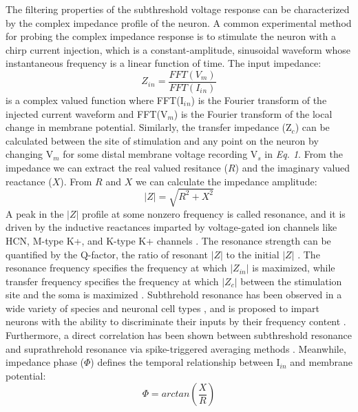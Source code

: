 \documentclass[utf8]{frontiersSCNS} %
\begin{document}
The filtering properties of the subthreshold voltage response can be characterized by the complex impedance profile of the neuron.
A common experimental method for probing the complex impedance response is to stimulate the neuron with a chirp current injection, which
is a constant-amplitude, sinusoidal waveform whose instantaneous frequency is a linear function of time.  The input impedance:
\begin{equation}  Z_i{_n} = \frac{FFT(V_m)}{FFT(I_i{_n})} \label{eq:01}\end{equation}
is a complex valued function where FFT(I$_i{_n}$) is the Fourier transform of the injected current waveform and FFT(V$_m$) is the Fourier
transform of the local change in membrane potential.  Similarly, the transfer impedance (Z$_c$) can be calculated between the site of stimulation
and any point on the neuron by changing V$_m$ for some distal membrane voltage recording V$_s$ in \emph{Eq. 1}. From the impedance we can
extract the real valued resitance ($R$) and the imaginary valued reactance ($X$).  From $R$ and $X$ we can calculate the impedance amplitude:
\begin{equation} |Z| = \sqrt{R^2 + X^2} \label{eq:02}\end{equation}
A peak in the $|Z|$ profile at some nonzero frequency is called resonance, and it is driven by
the inductive reactances imparted by voltage-gated ion channels like HCN, M-type K+, and 
K-type K+ channels \citep{Das2017-nz}.  The resonance strength can be quantified by the 
Q-factor, the ratio of resonant $|Z|$ to the initial $|Z|$ \citep{Dewell2019-ra}. The 
resonance frequency specifies the frequency at which $|Z_{in}|$ is maximized, while
transfer frequency specifies the frequency at which $|Z_c|$ between the stimulation site and 
the soma is maximized \cite{Dembrow2015-zb}.  Subthrehold resonance has been observed in a wide 
variety of species and neuronal cell types \citep{Crawford1981-av, Puil1988-ca, Hutcheon2000-gs, Yoshida2011-ec, Ulrich2002-dd},
and is proposed to impart neurons with the ability to discriminate their inputs by their 
frequency content \citep{Das2017-nz}. Furthermore, a direct correlation has been shown between subthreshold resonance and suprathrehold
resonance via spike-triggered averaging methods \citep{Das2015-mh}.
Meanwhile, impedance phase ($\Phi$) defines the temporal relationship between I$_{in}$ and membrane potential:
\begin{equation} \Phi = arctan(\frac{X}{R}) \label{eq:03}\end{equation}
\end{document}

